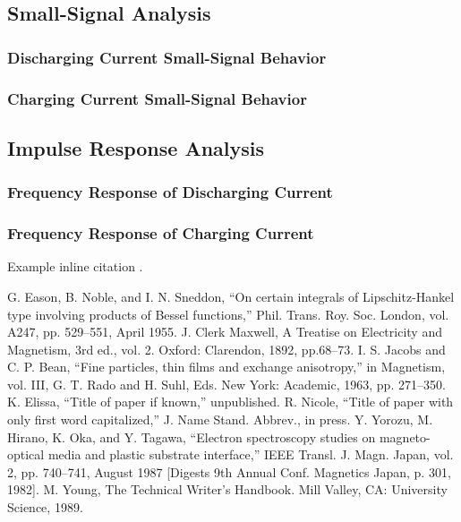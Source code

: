 \documentclass[conference]{IEEEtran}
\begin{document}
\subsection{Small-Signal Analysis}

\subsubsection{Discharging Current Small-Signal Behavior}

\subsubsection{Charging Current Small-Signal Behavior}

\subsection{Impulse Response Analysis}
\subsubsection{Frequency Response of Discharging Current}
\subsubsection{Frequency Response of Charging Current}
Example inline citation
\cite{b6}.

\begin{thebibliography}{00}
 G. Eason, B. Noble, and I. N. Sneddon, ``On certain integrals of Lipschitz-Hankel type involving products of Bessel functions,'' Phil. Trans. Roy. Soc. London, vol. A247, pp. 529--551, April 1955.
 J. Clerk Maxwell, A Treatise on Electricity and Magnetism, 3rd ed., vol. 2. Oxford: Clarendon, 1892, pp.68--73.
 I. S. Jacobs and C. P. Bean, ``Fine particles, thin films and exchange anisotropy,'' in Magnetism, vol. III, G. T. Rado and H. Suhl, Eds. New York: Academic, 1963, pp. 271--350.
 K. Elissa, ``Title of paper if known,'' unpublished.
 R. Nicole, ``Title of paper with only first word capitalized,'' J. Name Stand. Abbrev., in press.
 Y. Yorozu, M. Hirano, K. Oka, and Y. Tagawa, ``Electron spectroscopy studies on magneto-optical media and plastic substrate interface,'' IEEE Transl. J. Magn. Japan, vol. 2, pp. 740--741, August 1987 [Digests 9th Annual Conf. Magnetics Japan, p. 301, 1982].
 M. Young, The Technical Writer's Handbook. Mill Valley, CA: University Science, 1989.
\end{thebibliography}
\end{document}
